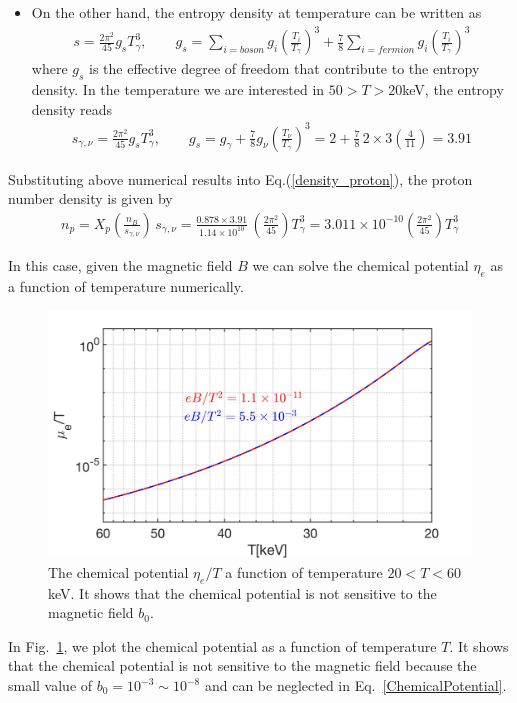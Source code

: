 \documentclass[Universe,article,submit,moreauthors,pdftex]{Definitions/mdpi}
\newcommand*{\req}[1]{Eq.~{\eqref{#1}}}
\newcommand*{\rf}[1]{Fig.~{\ref{#1}}}
\begin{document}
\begin{itemize}
  \item On the other hand, the entropy density at temperature can be written as \cite{Kolb:1990vq}
\begin{align}
s=\frac{2\pi^2}{45}g_sT_\gamma^3,\qquad g_s=\sum_{i=boson}g_i\left(\frac{T_i}{T_\gamma}\right)^3+\frac{7}{8}\sum_{i=fermion}g_i\left(\frac{T_i}{T_\gamma}\right)^3
\end{align}
where $g_s$ is the effective degree of freedom that contribute to the entropy density.  In the temperature we are interested in $50>T>20$keV, the entropy density reads
\begin{align}
s_{\gamma,\nu}=\frac{2\pi^2}{45}g_sT_\gamma^3,\qquad g_s=g_\gamma+\frac{7}{8}g_\nu\left(\frac{T_\nu}{T_\gamma}\right)^3=2+\frac{7}{8}\,2\times3\left(\frac{4}{11}\right)=3.91
\end{align}
\end{itemize}

Substituting above numerical results into Eq.(\ref{density_proton}), the proton number density is given by
\begin{align}
n_p= X_p\left(\frac{n_B}{s_{\gamma,\nu}}\right)\,s_{\gamma,\nu}=\frac{0.878\times3.91}{1.14\times10^{10}}\,\left(\frac{2\pi^2}{45}\right)T_\gamma^3=3.011\times10^{-10}\left(\frac{2\pi^2}{45}\right)T_\gamma^3
\end{align}

In this case, given the magnetic field $B$ we can solve the chemical potential $\eta_{e}$ as a function of temperature numerically.
\begin{figure}[h]
\centering
\includegraphics[width=0.75\linewidth]{./plots/ChemicalPotential_case1.jpg}
\caption{The chemical potential $\eta_{e}/T$ a function of temperature $20<T<60$keV.  It shows that the chemical potential is not sensitive to the magnetic field $b_0$.}
\label{chemical_fig} 
\end{figure}
In {\rf{chemical_fig}}, we plot the  chemical potential as a function of temperature $T$. It shows that the chemical potential is not sensitive to the magnetic field because the small value of $b_0=10^{-3}\sim10^{-8}$ and can be neglected in \req{ChemicalPotential}. 
\end{document}
